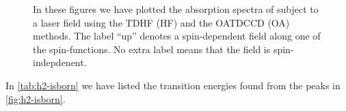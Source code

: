 \begin{figure}
            \caption{In these figures we have plotted the absorption spectra of
             subject to a laser field using the TDHF (HF) and the OATDCCD
            (OA) methods.
            The label ``up'' denotes a spin-dependent field along one of the
            spin-functions.
            No extra label means that the field is spin-indepdenent.}
            \label{fig:h2-isborn}
        \end{figure}
        In \autoref{tab:h2-isborn} we have listed the transition energies found
        from the peaks in \autoref{fig:h2-isborn}.
